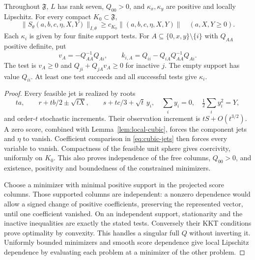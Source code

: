 \begin{proposition}\label{prop:cubic-Q}
Throughout $\mathfrak F$, $L$ has rank seven, $Q_{00}>0$, and
$\kappa_x,\kappa_y$ are positive and locally Lipschitz. For every compact
$K_0\subset\mathfrak F$,
\[
 \|S_\theta(a,b,c,\eta,X,Y)\|_{I,\theta}
       \ge c_{K_0}\|(a,b,c,\eta,X,Y)\|\quad(a,X,Y\ge0).
\]
Each $\kappa_i$ is given by four finite support tests. For
$A\subseteq\{0,x,y\}\setminus\{i\}$ with $Q_{AA}$ positive definite, put
\[
 v_A=-Q_{AA}^{-1}Q_{Ai},\qquad k_{i,A}=Q_{ii}-Q_{iA}Q_{AA}^{-1}Q_{Ai}.
\]
The test is $v_A\ge0$ and $Q_{ji}+Q_{jA}v_A\ge0$ for inactive $j$.
The empty support has value $Q_{ii}$. At least one test succeeds and
all successful tests give $\kappa_i$.
\end{proposition}
\begin{proof}
Every feasible jet is realized by roots
\[
 ta,\qquad r+tb/2\pm\sqrt{tX},\qquad
 s+tc/3+\sqrt t\,y_i,\quad \sum_i y_i=0,\quad\tfrac12\sum_i y_i^2=Y,
\]
and order-$t$ stochastic increments. Their observation increment is
$tS+O(t^{3/2})$. A zero score, combined with
Lemma~\ref{lem:local-cubic}, forces the component jets and $\eta$ to
vanish. Coefficient comparison in \eqref{eq:cubic-jets} then forces
every variable to vanish. Compactness of the feasible unit sphere gives
coercivity, uniformly on $K_0$. This also proves independence of the free
columns, $Q_{00}>0$, and existence, positivity and boundedness of the
constrained minimizers.

Choose a minimizer with minimal positive support in the projected score
columns. Those supported columns are independent: a nonzero dependence
would allow a signed change of positive coefficients, preserving the
represented vector, until one coefficient vanished. On an independent
support, stationarity and the inactive inequalities are exactly the
stated tests. Conversely their KKT conditions prove optimality by
convexity. This handles a singular full $Q$ without inverting it.
Uniformly bounded minimizers and smooth score dependence give local
Lipschitz dependence by evaluating each problem at a minimizer of the
other problem.
\end{proof}

